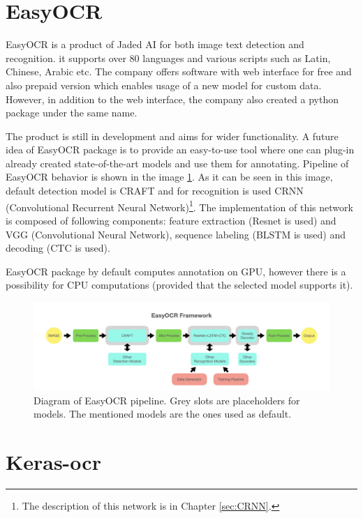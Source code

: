 \section{EasyOCR}

EasyOCR is a product of Jaded AI for both image text detection and recognition. it supports over 80 languages and various scripts such as Latin, Chinese, Arabic etc. The company offers software with web interface for free and also prepaid version which enables usage of a new model for custom data. However, in addition to the web interface, the company also created a python package under the same name.\cite{easyocr1}

The product is still in development and aims for wider functionality. A future idea of EasyOCR package is to provide an easy-to-use tool where one can plug-in already created state-of-the-art models and use them for annotating. Pipeline of EasyOCR behavior is shown in the image \ref*{img:easyocrPipeline}. As it can be seen in this image, default detection model is CRAFT and for recognition is used CRNN (Convolutional Recurrent Neural Network)\footnote{The description of this network is in Chapter \ref*{sec:CRNN}.}. The implementation of this network is composed of following components: feature extraction (Resnet is used) and VGG (Convolutional Neural Network), sequence labeling (BLSTM is used) and decoding (CTC is used).\cite{easyocr2}

EasyOCR package by default computes annotation on GPU, however there is a possibility for CPU computations (provided that the selected model supports it). 

\begin{figure}[hbtp]
    \centering
    \includegraphics[scale=0.4]{obrazky/easyocr_framework.jpeg}
    \caption{Diagram of EasyOCR pipeline. Grey slots are placeholders for models. The mentioned models are the ones used as default. \cite{easyocr2}}
    \label{img:easyocrPipeline}
\end{figure}

\section{Keras-ocr}

